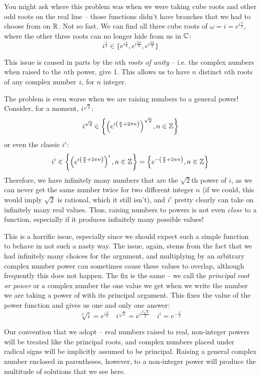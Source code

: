 You might ask where this problem was when we were taking cube roots and other odd roots on the real line -- those functions didn't have branches that we had to choose from on $\mathbb R$. Not so fast. We can find all three cube roots of $\omega = i = e^{i\frac{\pi}{2}}$, where the other three roots can no longer hide from us in $\mathbb C$:
\[
    i^\frac{1}{3} \in \{e^{i \frac{\pi}{6}}, e^{i \frac{5\pi}{6}}, e^{i \frac{3\pi}{2}} \}
\]

This issue is caused in parts by the $n$th \textit{roots of unity} -- i.e. the complex numbers when raised to the $n$th power, give 1. This allows us to have $n$ distinct $n$th roots of any complex number $z$, for $n$ integer.

The problem is even worse when we are raising numbers to a general power! Consider, for a moment, $i^{\sqrt{2}}$:
\[
    i^{\sqrt{2}} \in \left\{ \left(e^{i \left(\frac{\pi}{2} + 2\pi n \right) } \right)^{\sqrt{2}}, n \in \mathbb Z \right\}
\]
or even the classic $i^i$:
\[
    i^i \in \left\{ \left(e^{i \left(\frac{\pi}{2} + 2\pi n \right) } \right)^i, n \in \mathbb Z \right\} = \left\{ e^{- \left(\frac{\pi}{2} + 2\pi n \right) } , n \in \mathbb Z \right\}
\]
Therefore, we have infinitely many numbers that are the $\sqrt{2}$th power of $i$, as we can never get the same number twice for two different integer $n$ (if we could, this would imply $\sqrt{2}$ is rational, which it still isn't), and $i^i$ pretty clearly can take on infinitely many real values. Thus, raising numbers to powers is not even \textit{close} to a function, especially if it produces infinitely many possible values!

This is a horrific issue, especially since we should expect such a simple function to behave in not such a nasty way. The issue, again, stems from the fact that we had infinitely many choices for the argument, and multiplying by an arbitrary complex number power can sometimes cause these values to overlap, although frequently this does not happen. The fix is the same -- we call the \textit{principal root or power} or a complex number the one value we get when we write the number we are taking a power of with its principal argument. This fixes the value of the power function and gives us one and only one answer:
\[
    \sqrt[3]{i} = e^{i \frac{\pi}{6}} \quad i^{\sqrt{2}} = e^{i \frac{\pi \sqrt{2}}{2}} \quad i^i = e^{-\frac{\pi}{2}}
\]

Our convention that we adopt -- real numbers raised to real, non-integer powers will be treated like the principal roots, and complex numbers placed under radical signs will be implicitly assumed to be principal. Raising a general complex number enclosed in parentheses, however, to a non-integer power will produce the multitude of solutions that we see here.

